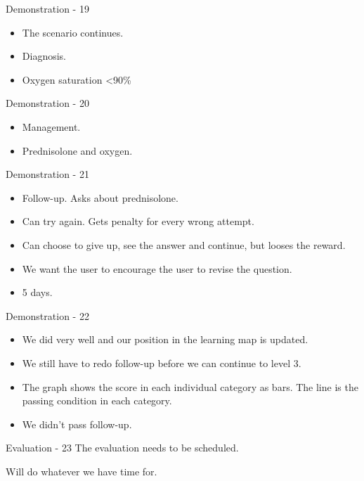 \documentclass{beamer}
\begin{document}
\begin{frame}{Demonstration - 19}
\begin{itemize}
	\item The scenario continues.
	\item Diagnosis.
	\item Oxygen saturation <90\%
\end{itemize}
\end{frame}

\begin{frame}{Demonstration - 20}
\begin{itemize}
	\item Management.
	\item Prednisolone and oxygen.
\end{itemize}
\end{frame}

\begin{frame}{Demonstration - 21}
\begin{itemize}
	\item Follow-up. Asks about prednisolone.
	\item Can try again. Gets penalty for every wrong attempt.
	\item Can choose to give up, see the answer and continue, but looses the reward.
	\item We want the user to encourage the user to revise the question.
	\item 5 days.
\end{itemize}
\end{frame}

\begin{frame}{Demonstration - 22}
\begin{itemize}
	\item We did very well and our position in the learning map is updated.
	\item We still have to redo follow-up before we can continue to level 3.
	\item The graph shows the score in each individual category as bars. The line is the passing condition in each category.
	\item We didn't pass follow-up.
\end{itemize}
\end{frame}

\begin{frame}{Evaluation - 23}
The evaluation needs to be scheduled.

Will do whatever we have time for.
\end{frame}
\end{document}
